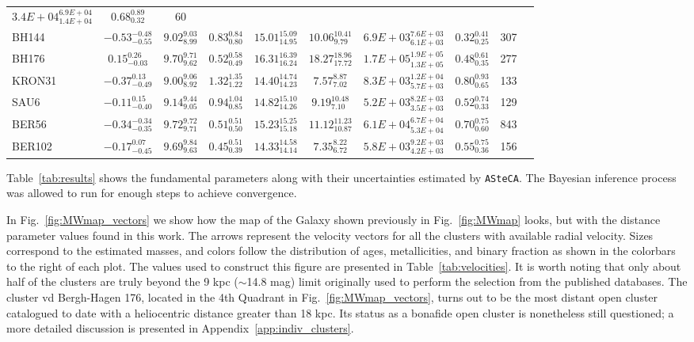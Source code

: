 \documentclass[draft]{aa}
\begin{document}
\begin{table}
\begin{tabular}{lccccccccc}
    $3.4E+04_{1.4E+04}^{6.9E+04}$ & $0.68_{0.32}^{0.89}$ & 60 \\[.2cm]
    BH144 & $-0.53_{-0.55}^{-0.48}$ & $9.02_{8.99}^{9.03}$ &
    $0.83_{0.80}^{0.84}$ & $15.01_{14.95}^{15.09}$ & $10.06_{9.79}^{10.41}$ &
    $6.9E+03_{6.1E+03}^{7.6E+03}$ & $0.32_{0.25}^{0.41}$ & 307 \\[.2cm]
    BH176 & $0.15_{-0.03}^{0.26}$ & $9.70_{9.62}^{9.71}$ &
    $0.52_{0.49}^{0.58}$ & $16.31_{16.24}^{16.39}$ & $18.27_{17.72}^{18.96}$ &
    $1.7E+05_{1.3E+05}^{1.9E+05}$ & $0.48_{0.35}^{0.61}$ & 277 \\[.2cm]
    KRON31 & $-0.37_{-0.49}^{0.13}$ & $9.00_{8.92}^{9.06}$ &
    $1.32_{1.22}^{1.35}$ & $14.40_{14.23}^{14.74}$ & $7.57_{7.02}^{8.87}$ &
    $8.3E+03_{5.7E+03}^{1.2E+04}$ & $0.80_{0.65}^{0.93}$ & 133 \\[.2cm]
    SAU6 & $-0.11_{-0.40}^{0.15}$ & $9.14_{9.05}^{9.44}$ &
    $0.94_{0.85}^{1.04}$ & $14.82_{14.26}^{15.10}$ & $9.19_{7.10}^{10.48}$ &
    $5.2E+03_{3.5E+03}^{8.2E+03}$ & $0.52_{0.33}^{0.74}$ & 129 \\[.2cm]
    BER56 & $-0.34_{-0.35}^{-0.34}$ & $9.72_{9.71}^{9.72}$ &
    $0.51_{0.50}^{0.51}$ & $15.23_{15.18}^{15.25}$ & $11.12_{10.87}^{11.23}$ &
    $6.1E+04_{5.3E+04}^{6.7E+04}$ & $0.70_{0.60}^{0.75}$ & 843 \\[.2cm]
    BER102 & $-0.17_{-0.45}^{0.07}$ & $9.69_{9.63}^{9.84}$ &
    $0.45_{0.39}^{0.51}$ & $14.33_{14.14}^{14.58}$ & $7.35_{6.72}^{8.22}$ &
    $5.8E+03_{4.2E+03}^{9.2E+03}$ & $0.55_{0.36}^{0.75}$ & 156 \\[.2cm]
  \hline
  \end{tabular}
  \end{table}


  Table~\ref{tab:results} shows the fundamental parameters along with their
  uncertainties estimated by \texttt{ASteCA}. The Bayesian inference process
  was allowed to run for enough steps to achieve convergence.

  In Fig.~\ref{fig:MWmap_vectors} we show how the map of the Galaxy shown
  previously in Fig.~\ref{fig:MWmap} looks, but with the distance parameter
  values found in this work. The arrows represent the velocity vectors for all
  the clusters with available radial velocity. Sizes correspond to the estimated
  masses, and colors follow the distribution of ages, metallicities, and binary
  fraction as shown in the colorbars to the right of each plot. The values used
  to construct this figure are presented in Table~\ref{tab:velocities}.
  It is worth noting that only about half of the clusters are truly beyond the 9
  kpc ($\sim$14.8 mag) limit originally used to perform the selection from the
  published databases.
  The cluster vd Bergh-Hagen 176, located in the 4th Quadrant
  in Fig.~\ref{fig:MWmap_vectors}, turns out to be the most distant open cluster
  catalogued to date with a heliocentric distance greater than 18 kpc. Its
  status as a bonafide open cluster is nonetheless still questioned; a more
  detailed discussion is presented in Appendix~\ref{app:indiv_clusters}.
\end{document}
